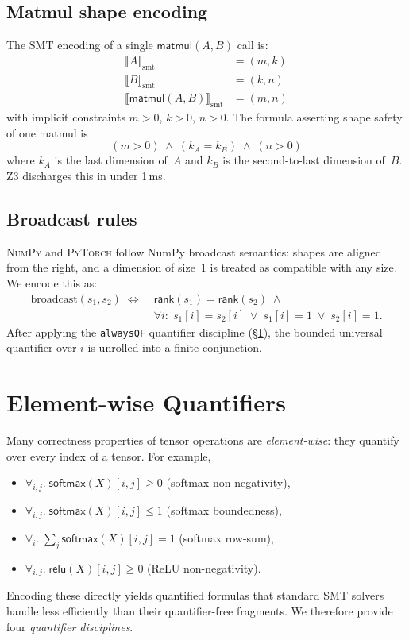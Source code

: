 \documentclass[11pt]{article}
\newcommand{\TRank}[1]{\mathsf{rank}(#1)}          %
\newcommand{\TMatmul}{\mathsf{matmul}}             %
\newcommand{\TSoftmax}{\mathsf{softmax}}           %
\newcommand{\shapeenc}[1]{\llbracket #1 \rrbracket_{\mathrm{smt}}}
\newcommand{\QForall}[2]{\forall_{#1}.\;#2}        %
\newcommand{\PyTorch}{\textsc{PyTorch}\xspace}
\newcommand{\NumPy}{\textsc{NumPy}\xspace}
\begin{document}
\subsection{Matmul shape encoding}

The SMT encoding of a single $\TMatmul(A,B)$ call is:
\begin{align}
\shapeenc{A} &= (m, k) \label{eq:matmul-pre1} \\
\shapeenc{B} &= (k, n) \label{eq:matmul-pre2} \\
\shapeenc{\TMatmul(A,B)} &= (m, n) \label{eq:matmul-post}
\end{align}
with implicit constraints $m > 0$, $k > 0$, $n > 0$.
The \QFLIA{} formula asserting shape safety of one matmul is
\[
  (m > 0) \;\wedge\; (k_A = k_B) \;\wedge\; (n > 0)
\]
where $k_A$ is the last dimension of~$A$ and $k_B$ is the
second-to-last dimension of~$B$.
Z3 discharges this in under 1\,ms.

\subsection{Broadcast rules}

\NumPy and \PyTorch follow NumPy broadcast semantics: shapes are
aligned from the right, and a dimension of size~1 is treated as
compatible with any size.  We encode this as:
\begin{align}
\text{broadcast}(s_1, s_2) \;\iff\;&
  \TRank{s_1} = \TRank{s_2} \;\wedge \\
  &\forall i:\;
  s_1[i] = s_2[i] \;\vee\; s_1[i] = 1 \;\vee\; s_2[i] = 1. \nonumber
\end{align}
After applying the \texttt{alwaysQF} quantifier discipline
(\S\ref{sec:quant}), the bounded universal quantifier over $i$ is
unrolled into a finite conjunction.

\section{Element-wise Quantifiers}
\label{sec:quant}

Many correctness properties of tensor operations are \emph{element-wise}:
they quantify over every index of a tensor.  For example,
\begin{itemize}
\item $\QForall{i,j}{\TSoftmax(X)[i,j] \geq 0}$
      (softmax non-negativity),
\item $\QForall{i,j}{\TSoftmax(X)[i,j] \leq 1}$
      (softmax boundedness),
\item $\QForall{i}{\sum_j \TSoftmax(X)[i,j] = 1}$
      (softmax row-sum),
\item $\QForall{i,j}{\mathsf{relu}(X)[i,j] \geq 0}$
      (ReLU non-negativity).
\end{itemize}
Encoding these directly yields quantified formulas that standard SMT
solvers handle less efficiently than their quantifier-free fragments.
We therefore provide four \emph{quantifier disciplines}.
\end{document}
